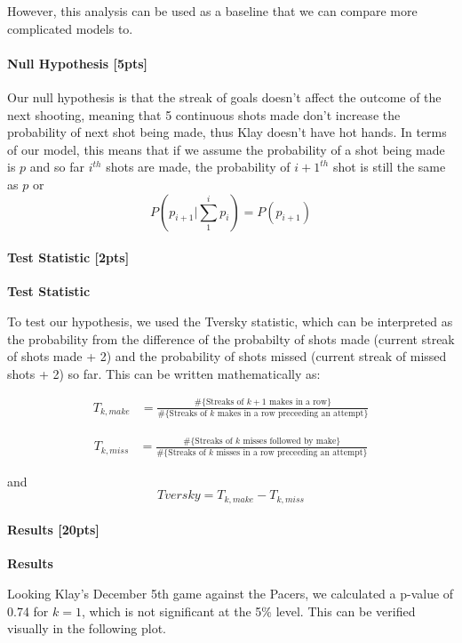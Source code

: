 \documentclass[11pt]{article}
\begin{document}
However, this analysis can be used as a baseline that we can compare
more complicated models to.

    \paragraph{Null Hypothesis {[}5pts{]}}\label{null-hypothesis-5pts}

    Our null hypothesis is that the streak of goals doesn't affect the
outcome of the next shooting, meaning that 5 continuous shots made don't
increase the probability of next shot being made, thus Klay doesn't have
hot hands. In terms of our model, this means that if we assume the
probability of a shot being made is \(p\) and so far \(i^{th}\) shots
are made, the probability of \(i+1^{th}\) shot is still the same as
\(p\) or \[P(p_{i+1}|\sum_1^i{p_i}) = P(p_{i+1})\]

    \paragraph{Test Statistic {[}2pts{]}}\label{test-statistic-2pts}

    \textbf{Test Statistic}

To test our hypothesis, we used the Tversky statistic, which can be
interpreted as the probability from the difference of the probabilty of
shots made (current streak of shots made + 2) and the probability of
shots missed (current streak of missed shots + 2) so far. This can be
written mathematically as:

\begin{align*}
  T_{k, make}
  & = \frac{\#\{\text{Streaks of $k+1$ makes in a row}\}}{\#\{\text{Streaks of $k$ makes in a row preceeding an attempt}\}}
\end{align*}

\begin{align*}
  T_{k, miss}
  & = \frac{\#\{\text{Streaks of $k$ misses followed by make}\}}{\#\{\text{Streaks of $k$ misses in a row preceeding an attempt}\}}
\end{align*}

and \[Tversky = T_{k, make} - T_{k, miss}\]

    \paragraph{Results {[}20pts{]}}\label{results-20pts}

    \textbf{Results}

Looking Klay's December 5th game against the Pacers, we calculated a
p-value of 0.74 for \(k=1\), which is not significant at the 5\% level.
This can be verified visually in the following plot.
\end{document}
